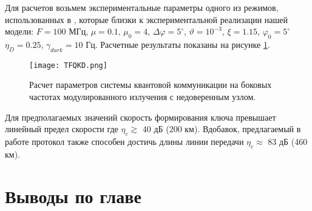 Для расчетов возьмем экспериментальные параметры одного из режимов, использованных в \cite{Gleim16,Miroshnichenko18}, которые близки к экспериментальной реализации нашей модели: $F=100$ МГц, $\mu=0.1$, $\mu_0=4$, $\Delta\varphi=5^{\circ}$, $\vartheta=10^{-3}$, $\xi=1.15$, $\varphi_0=5^{\circ}$ $\eta_D=0.25$, $\gamma_{dark}= 10$ Гц. Расчетные результаты показаны на рисунке \ref{fig:fig2}.

\begin{figure}
	\texttt{[image: TFQKD.png]}
	\caption{Расчет параметров системы квантовой коммуникации на боковых частотах модулированного излучения с недоверенным узлом.}
	\label{fig:fig2}
\end{figure}

Для предполагаемых значений скорость формирования ключа превышает линейный предел скорости \cite{pirandola2017fundamental} где $\eta_c \gtrsim$ 40 дБ (200 км). Вдобавок, предлагаемый в работе протокол также способен достичь длины линии передачи $\eta_c\approx$ 83 дБ (460 км).



\pagebreak

\section{Выводы по главе} \label{ch:ch6/sec3}





